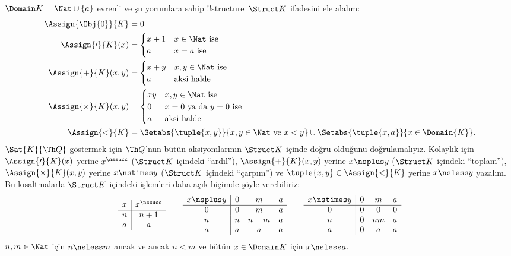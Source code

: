 \begin{ex}
$\Domain K=\Nat\cup\{a\}$ evrenli ve şu yorumlara sahip
!!{structure}~$\Struct K$ ifadesini ele alalım:
\begin{align*}
  \Assign{\Obj{0}}{K} & = 0\\
  \Assign{\prime}{K}(x) & =
  \begin{cases}
    x+1 & \text{$x\in\Nat$ ise}\\
    a & \text{$x=a$ ise}
  \end{cases}\\
  \Assign{+}{K}(x, y) & =
  \begin{cases}
    x+y & \text{$x,y\in\Nat$ ise}\\
    a & \text{aksi halde}
  \end{cases}\\
  \Assign{\times}{K}(x, y) & =
  \begin{cases}
    xy & \text{$x,y\in\Nat$ ise}\\
    0 & \text{$x=0$ ya da $y=0$ ise}\\
    a & \text{aksi halde}\\
  \end{cases}\\
  \Assign{<}{K} & =
  \Setabs{\tuple{x,y}}{x, y \in \Nat \text{ ve } x<y} \cup
  \Setabs{\tuple{x,a}}{x \in \Domain{K}}.
\end{align*}
$\Sat{K}{\Th Q}$ göstermek için $\Th Q$'nun bütün aksiyomlarının
$\Struct K$ içinde doğru olduğunu doğrulamalıyız. Kolaylık için
$\Assign{\prime}{K}(x)$ yerine $x^\nssucc$ ($\Struct K$ içindeki
``ardıl''), $\Assign{+}{K}(x,y)$ yerine $x\nsplus y$ ($\Struct K$
içindeki ``toplam''), $\Assign{\times}{K}(x,y)$ yerine
$x\nstimes y$ ($\Struct K$ içindeki ``çarpım'') ve
$\tuple{x,y}\in\Assign{<}{K}$ yerine $x\nsless y$ yazalım. Bu
kısaltmalarla $\Struct K$ içindeki işlemleri daha açık biçimde şöyle
verebiliriz:
\[
\begin{array}{c|c}
  x & x^\nssucc \\
  \hline
  n & n+1 \\
  a & a
\end{array}
\qquad
\begin{array}{c|ccc}
  x \nsplus y & 0 & m & a \\
  \hline
  0 & 0 & m & a \\
  n & n & n+m & a \\
  a & a & a & a \\
\end{array}
\qquad
\begin{array}{c|ccc}
  x \nstimes y & 0 & m & a \\
  \hline
  0 & 0 & 0 & 0 \\
  n & 0 & nm & a \\
  a & 0 & a & a \\
\end{array}
\]
$n,m\in\Nat$ için $n\nsless m$ ancak ve ancak $n<m$ ve bütün
$x\in\Domain K$ için $x\nsless a$.


\end{ex}

